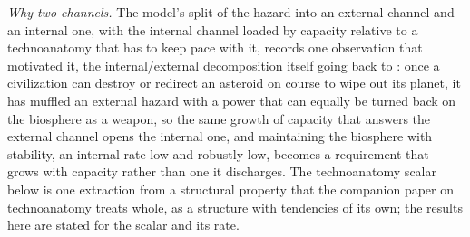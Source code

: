 \noindent\textit{Why two channels.} The model's split of the hazard into an external channel and an internal one, with the internal channel loaded by capacity relative to a technoanatomy that has to keep pace with it, records one observation that motivated it, the internal/external decomposition itself going back to \cite{GoldenScience2022}: once a civilization can destroy or redirect an asteroid on course to wipe out its planet, it has muffled an external hazard with a power that can equally be turned back on the biosphere as a weapon, so the same growth of capacity that answers the external channel opens the internal one, and maintaining the biosphere with stability, an internal rate low and robustly low, becomes a requirement that grows with capacity rather than one it discharges. The technoanatomy scalar below is one extraction from a structural property that the companion paper on technoanatomy treats whole, as a structure with tendencies of its own; the results here are stated for the scalar and its rate.


